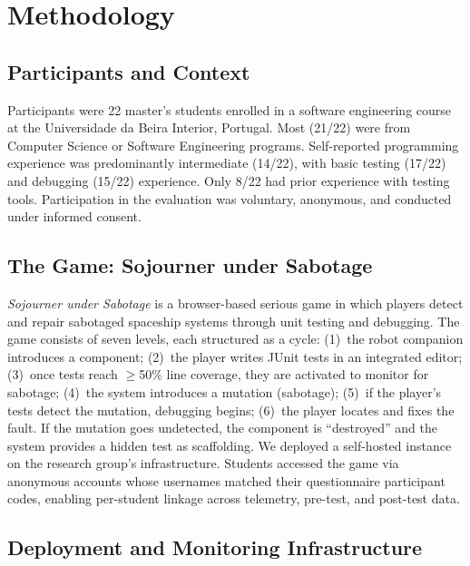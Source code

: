 \documentclass[conference]{IEEEtran}
\begin{document}
\section{Methodology}
\label{sec:methodology}

\subsection{Participants and Context}

Participants were 22 master's students enrolled in a software engineering course at the Universidade da Beira Interior, Portugal.
Most (21/22) were from Computer Science or Software Engineering programs.
Self-reported programming experience was predominantly intermediate (14/22), with basic testing (17/22) and debugging (15/22) experience.
Only 8/22 had prior experience with testing tools.
Participation in the evaluation was voluntary, anonymous, and conducted under informed consent.

\subsection{The Game: Sojourner under Sabotage}

\emph{Sojourner under Sabotage} is a browser-based serious game in which players detect and repair sabotaged spaceship systems through unit testing and debugging.
The game consists of seven levels, each structured as a cycle: (1)~the robot companion introduces a component; (2)~the player writes JUnit tests in an integrated editor; (3)~once tests reach $\geq$50\% line coverage, they are activated to monitor for sabotage; (4)~the system introduces a mutation (sabotage); (5)~if the player's tests detect the mutation, debugging begins; (6)~the player locates and fixes the fault.
If the mutation goes undetected, the component is ``destroyed'' and the system provides a hidden test as scaffolding.
We deployed a self-hosted instance on the research group's infrastructure.
Students accessed the game via anonymous accounts whose usernames matched their questionnaire participant codes, enabling per-student linkage across telemetry, pre-test, and post-test data.

\subsection{Deployment and Monitoring Infrastructure}
\end{document}
